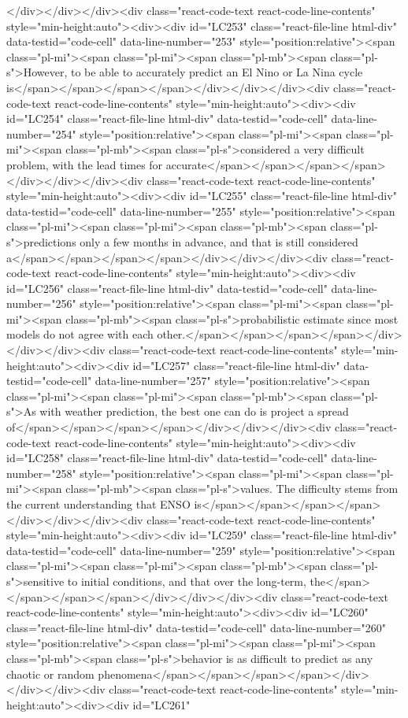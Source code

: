 {{{</div></div></div><div class="react-code-text react-code-line-contents" style="min-height:auto"><div><div id="LC253" class="react-file-line html-div" data-testid="code-cell" data-line-number="253" style="position:relative"><span class="pl-mi"><span class="pl-mi"><span class="pl-mb"><span class="pl-s">However, to be able to accurately predict an El Nino or La Nina cycle is</span></span></span></span></div></div></div><div class="react-code-text react-code-line-contents" style="min-height:auto"><div><div id="LC254" class="react-file-line html-div" data-testid="code-cell" data-line-number="254" style="position:relative"><span class="pl-mi"><span class="pl-mi"><span class="pl-mb"><span class="pl-s">considered a very difficult problem, with the lead times for accurate</span></span></span></span></div></div></div><div class="react-code-text react-code-line-contents" style="min-height:auto"><div><div id="LC255" class="react-file-line html-div" data-testid="code-cell" data-line-number="255" style="position:relative"><span class="pl-mi"><span class="pl-mi"><span class="pl-mb"><span class="pl-s">predictions only a few months in advance, and that is still considered a</span></span></span></span></div></div></div><div class="react-code-text react-code-line-contents" style="min-height:auto"><div><div id="LC256" class="react-file-line html-div" data-testid="code-cell" data-line-number="256" style="position:relative"><span class="pl-mi"><span class="pl-mi"><span class="pl-mb"><span class="pl-s">probabilistic estimate since most models do not agree with each other.</span></span></span></span></div></div></div><div class="react-code-text react-code-line-contents" style="min-height:auto"><div><div id="LC257" class="react-file-line html-div" data-testid="code-cell" data-line-number="257" style="position:relative"><span class="pl-mi"><span class="pl-mi"><span class="pl-mb"><span class="pl-s">As with weather prediction, the best one can do is project a spread of</span></span></span></span></div></div></div><div class="react-code-text react-code-line-contents" style="min-height:auto"><div><div id="LC258" class="react-file-line html-div" data-testid="code-cell" data-line-number="258" style="position:relative"><span class="pl-mi"><span class="pl-mi"><span class="pl-mb"><span class="pl-s">values. The difficulty stems from the current understanding that ENSO is</span></span></span></span></div></div></div><div class="react-code-text react-code-line-contents" style="min-height:auto"><div><div id="LC259" class="react-file-line html-div" data-testid="code-cell" data-line-number="259" style="position:relative"><span class="pl-mi"><span class="pl-mi"><span class="pl-mb"><span class="pl-s">sensitive to initial conditions, and that over the long-term, the</span></span></span></span></div></div></div><div class="react-code-text react-code-line-contents" style="min-height:auto"><div><div id="LC260" class="react-file-line html-div" data-testid="code-cell" data-line-number="260" style="position:relative"><span class="pl-mi"><span class="pl-mi"><span class="pl-mb"><span class="pl-s">behavior is as difficult to predict as any chaotic or random phenomena</span></span></span></span></div></div></div><div class="react-code-text react-code-line-contents" style="min-height:auto"><div><div id="LC261" }}}
